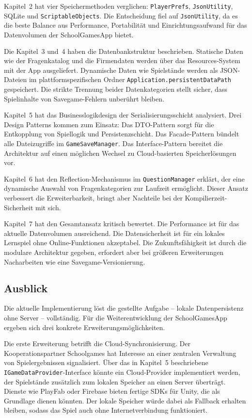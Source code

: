 \documentclass[12pt,a4paper]{article}
\begin{document}
Kapitel~2 hat vier Speichermethoden verglichen: \texttt{PlayerPrefs}, \texttt{JsonUtility}, SQLite und \texttt{ScriptableObjects}. Die Entscheidung fiel auf \texttt{JsonUtility}, da es die beste Balance aus Performance, Portabilität und Einrichtungsaufwand für das Datenvolumen der SchoolGamesApp bietet.

Die Kapitel~3 und~4 haben die Datenbankstruktur beschrieben. Statische Daten wie der Fragenkatalog und die Firmendaten werden über das Resources-System mit der App ausgeliefert. Dynamische Daten wie Spielstände werden als JSON-Dateien im plattformspezifischen Ordner \texttt{Application.persistentDataPath} gespeichert. Die strikte Trennung beider Datenkategorien stellt sicher, dass Spielinhalte von Savegame-Fehlern unberührt bleiben.

Kapitel~5 hat das Businesslogikdesign der Serialisierungsschicht analysiert. Drei Design Patterns kommen zum Einsatz: Das DTO-Pattern sorgt für die Entkopplung von Spiellogik und Persistenzschicht. Das Facade-Pattern bündelt alle Dateizugriffe im \texttt{GameSaveManager}. Das Interface-Pattern bereitet die Architektur auf einen möglichen Wechsel zu Cloud-basierten Speicherlösungen vor.

Kapitel~6 hat den Reflection-Mechanismus im \texttt{QuestionManager} erklärt, der eine dynamische Auswahl von Fragenkategorien zur Laufzeit ermöglicht. Dieser Ansatz verbessert die Erweiterbarkeit, bringt aber Nachteile bei der Kompilierzeit-Sicherheit mit sich.

Kapitel~7 hat den Gesamtansatz kritisch bewertet. Die Performance ist für das aktuelle Datenvolumen ausreichend. Die Datensicherheit ist für ein lokales Lernspiel ohne Online-Funktionen akzeptabel. Die Zukunftsfähigkeit ist durch die modulare Architektur gegeben, erfordert aber bei größeren Erweiterungen Nacharbeiten wie eine Savegame-Versionierung.

\subsection{Ausblick}

Die aktuelle Implementierung löst die gestellte Aufgabe -- lokale Datenpersistenz ohne Server -- vollständig. Für die Weiterentwicklung der SchoolGamesApp ergeben sich drei konkrete Erweiterungsmöglichkeiten.

Die erste Erweiterung betrifft die Cloud-Synchronisierung. Der Kooperationspartner Schoolgames hat Interesse an einer zentralen Verwaltung von Spielergebnissen signalisiert. Über das in Kapitel~5 beschriebene \texttt{IGameDataProvider}-Interface könnte ein Cloud-Provider implementiert werden, der Spielstände zusätzlich zum lokalen Speicher an einen Server überträgt. Dienste wie PlayFab oder Firebase bieten fertige SDKs für Unity, die als Grundlage dienen könnten. Der lokale Speicher würde dabei als Fallback erhalten bleiben, sodass das Spiel auch ohne Internetverbindung funktioniert.
\end{document}
